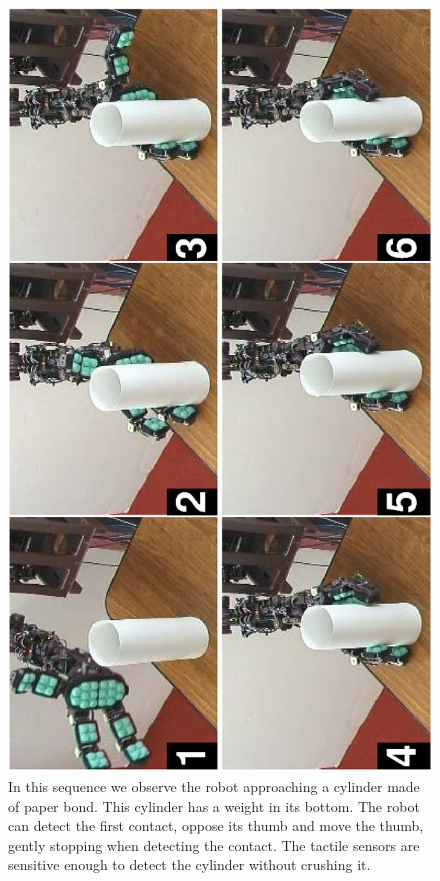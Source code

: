 \begin{figure}[tbp]
\centerline{
\includegraphics[height=\columnwidth, angle=270 ]{./figures/PaperGentle.eps}
} \caption[Gently grabbing a paper cylinder]{In this sequence we
observe the robot approaching a cylinder made of paper bond. This
cylinder has a weight in its bottom. The robot can detect the
first contact, oppose its thumb and move the thumb, gently
stopping when detecting the contact. The tactile sensors are
sensitive enough to detect the cylinder without crushing it.}
\label{fig:PaperGentle}
\end{figure}

